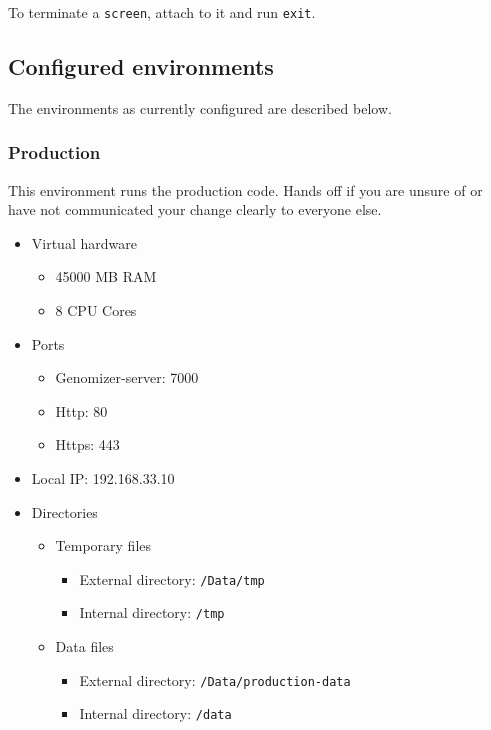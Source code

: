 To terminate a \texttt{screen}, attach to it and run \texttt{exit}.

\subsection{Configured environments}\label{configured-environments}

The environments as currently configured are described below.

\subsubsection{Production}\label{production}

This environment runs the production code. Hands off if you are unsure
of or have not communicated your change clearly to everyone else.

\begin{itemize}
\itemsep1pt\parskip0pt
\item
  Virtual hardware

  \begin{itemize}
  \itemsep1pt\parskip0pt
  \item
    45000 MB RAM
  \item
    8 CPU Cores
  \end{itemize}
\item
  Ports

  \begin{itemize}
  \itemsep1pt\parskip0pt
  \item
    Genomizer-server: 7000
  \item
    Http: 80
  \item
    Https: 443
  \end{itemize}
\item
  Local IP: 192.168.33.10
\item
  Directories

  \begin{itemize}
  \itemsep1pt\parskip0pt
  \item
    Temporary files

    \begin{itemize}
    \itemsep1pt\parskip0pt
    \item
      External directory: \texttt{/Data/tmp}
    \item
      Internal directory: \texttt{/tmp}
    \end{itemize}
  \item
    Data files

    \begin{itemize}
    \itemsep1pt\parskip0pt
    \item
      External directory: \texttt{/Data/production-data}
    \item
      Internal directory: \texttt{/data}
    \end{itemize}
  \end{itemize}
\end{itemize}

